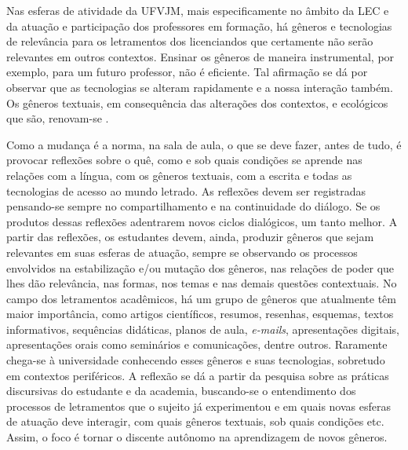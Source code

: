 \documentclass{textolivre}
\begin{document}
Nas esferas de atividade da UFVJM, mais especificamente no âmbito da LEC e da atuação e participação dos professores em formação, há gêneros e tecnologias de relevância para os letramentos dos licenciandos que certamente não serão relevantes em outros contextos. Ensinar os gêneros de maneira instrumental, por exemplo, para um futuro professor, não é eficiente. Tal afirmação se dá por observar que as tecnologias se alteram rapidamente e a nossa interação também. Os gêneros textuais, em consequência das alterações dos contextos, e ecológicos que são, renovam-se \cite{bakhtin_speech_1986}.

Como a mudança é a norma, na sala de aula, o que se deve fazer, antes de tudo, é provocar reflexões sobre o quê, como e sob quais condições se aprende nas relações com a língua, com os gêneros textuais, com a escrita e todas as tecnologias de acesso ao mundo letrado. As reflexões devem ser registradas pensando-se sempre no compartilhamento e na continuidade do diálogo. Se os produtos dessas reflexões adentrarem novos ciclos dialógicos, um tanto melhor. A partir das reflexões, os estudantes devem, ainda, produzir gêneros que sejam relevantes em suas esferas de atuação, sempre se observando os processos envolvidos na estabilização e/ou mutação dos gêneros, nas relações de poder que lhes dão relevância, nas formas, nos temas e nas demais questões contextuais. No campo dos letramentos acadêmicos, há um grupo de gêneros que atualmente têm maior importância, como artigos científicos, resumos, resenhas, esquemas, textos informativos, sequências didáticas, planos de aula, \textit{e-mails}, apresentações digitais, apresentações orais como seminários e comunicações, dentre outros. Raramente chega-se à universidade conhecendo esses gêneros e suas tecnologias, sobretudo em contextos periféricos. A reflexão se dá a partir da pesquisa sobre as práticas discursivas do estudante e da academia, buscando-se o entendimento dos processos de letramentos que o sujeito já experimentou e em quais novas esferas de atuação deve interagir, com quais gêneros textuais, sob quais condições etc. Assim, o foco é tornar o discente autônomo na aprendizagem de novos gêneros.
\end{document}
